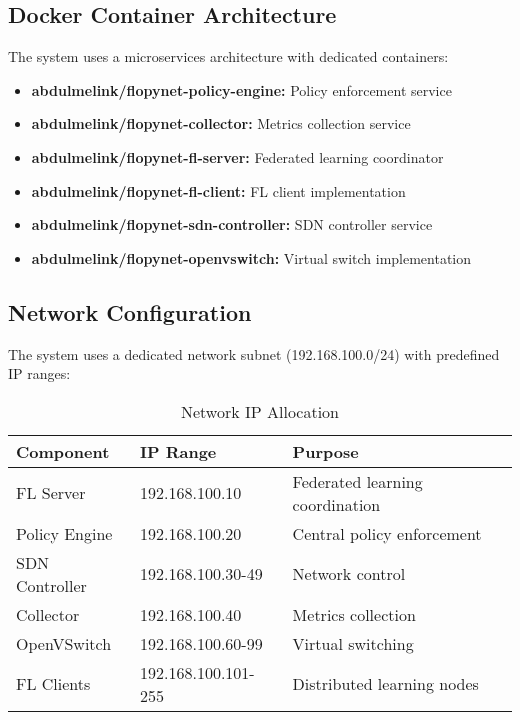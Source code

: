 \documentclass[12pt,a4paper,twoside]{article}
\begin{document}
\subsection{Docker Container Architecture}

The system uses a microservices architecture with dedicated containers:

\begin{itemize}
    \item \textbf{abdulmelink/flopynet-policy-engine:} Policy enforcement service
    \item \textbf{abdulmelink/flopynet-collector:} Metrics collection service
    \item \textbf{abdulmelink/flopynet-fl-server:} Federated learning coordinator
    \item \textbf{abdulmelink/flopynet-fl-client:} FL client implementation
    \item \textbf{abdulmelink/flopynet-sdn-controller:} SDN controller service
    \item \textbf{abdulmelink/flopynet-openvswitch:} Virtual switch implementation
\end{itemize}

\subsection{Network Configuration}

The system uses a dedicated network subnet (192.168.100.0/24) with predefined IP ranges:

\begin{table}[H]
\centering
\begin{tabular}{@{}lll@{}}
\toprule
\textbf{Component} & \textbf{IP Range} & \textbf{Purpose} \\
\midrule
FL Server & 192.168.100.10 & Federated learning coordination \\
Policy Engine & 192.168.100.20 & Central policy enforcement \\
SDN Controller & 192.168.100.30-49 & Network control \\
Collector & 192.168.100.40 & Metrics collection \\
OpenVSwitch & 192.168.100.60-99 & Virtual switching \\
FL Clients & 192.168.100.101-255 & Distributed learning nodes \\
\bottomrule
\end{tabular}
\caption{Network IP Allocation}
\label{tab:ip-ranges}
\end{table}
\end{document}

